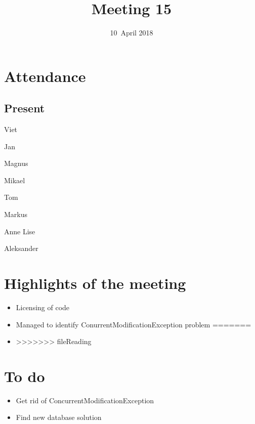 \documentclass[letterpaper,11pt]{article}
\title{Meeting 15}
\date{10~April 2018}
\begin{document}
\maketitle
\section*{Attendance}
\subsection*{Present}
\begin{list}{}{}
	\item Viet
	\item Jan
	\item Magnus
	\item Mikael
	\item Tom
	\item Markus
	\item Anne Lise
	\item Aleksander
\end{list}

\newpage
\section*{Highlights of the meeting}
\begin{itemize}
<<<<<<< HEAD
	\item Licensing of code
	\item Managed to identify ConurrentModificationException problem
=======
	\item
>>>>>>> fileReading
\end{itemize}

\section*{To do}
\begin{itemize}
<<<<<<< HEAD
	\item Get rid of ConcurrentModificationException
	\item Find new database solution
\end{itemize}
\end{document}
